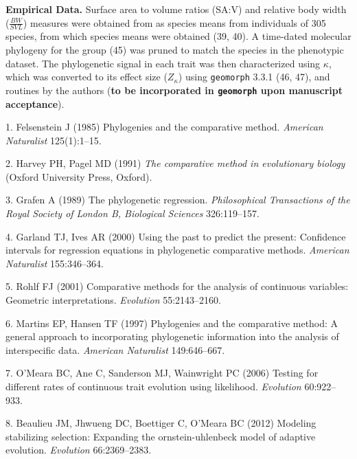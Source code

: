 \documentclass[9pt,twocolumn,twoside,lineno]{pnas-new}
\begin{document}
\textbf{Empirical Data.} Surface area to volume ratios (SA:V) and
relative body width (\(\frac{BW}{SVL}\)) measures were obtained from as
species means from individuals of 305 species, from which species means
were obtained (39, 40). A time-dated molecular phylogeny for the group
(45) was pruned to match the species in the phenotypic dataset. The
phylogenetic signal in each trait was then characterized using
\(\kappa\), which was converted to its effect size (\(Z_\kappa\)) using
\texttt{geomorph} 3.3.1 (46, 47), and routines by the authors
(\textbf{to be incorporated in \texttt{geomorph} upon manuscript
acceptance}).

\showmatmethods
\showacknow
\pnasbreak

\hypertarget{refs}{}
\leavevmode\hypertarget{ref-Felsenstein1985}{}%
1. Felsenstein J (1985) Phylogenies and the comparative method.
\emph{American Naturalist} 125(1):1--15.

\leavevmode\hypertarget{ref-HarveyPagel1991}{}%
2. Harvey PH, Pagel MD (1991) \emph{The comparative method in
evolutionary biology} (Oxford University Press, Oxford).

\leavevmode\hypertarget{ref-Grafen1989}{}%
3. Grafen A (1989) The phylogenetic regression. \emph{Philosophical
Transactions of the Royal Society of London B, Biological Sciences}
326:119--157.

\leavevmode\hypertarget{ref-GarlandIves2000}{}%
4. Garland TJ, Ives AR (2000) Using the past to predict the present:
Confidence intervals for regression equations in phylogenetic
comparative methods. \emph{American Naturalist} 155:346--364.

\leavevmode\hypertarget{ref-Rohlf2001}{}%
5. Rohlf FJ (2001) Comparative methods for the analysis of continuous
variables: Geometric interpretations. \emph{Evolution} 55:2143--2160.

\leavevmode\hypertarget{ref-MartinsHansen1997}{}%
6. Martins EP, Hansen TF (1997) Phylogenies and the comparative method:
A general approach to incorporating phylogenetic information into the
analysis of interspecific data. \emph{American Naturalist} 149:646--667.

\leavevmode\hypertarget{ref-OMeara_et_al2006}{}%
7. O'Meara BC, Ane C, Sanderson MJ, Wainwright PC (2006) Testing for
different rates of continuous trait evolution using likelihood.
\emph{Evolution} 60:922--933.

\leavevmode\hypertarget{ref-Beaulieu_et_al2012}{}%
8. Beaulieu JM, Jhwueng DC, Boettiger C, O'Meara BC (2012) Modeling
stabilizing selection: Expanding the ornstein-uhlenbeck model of
adaptive evolution. \emph{Evolution} 66:2369--2383.
\end{document}
